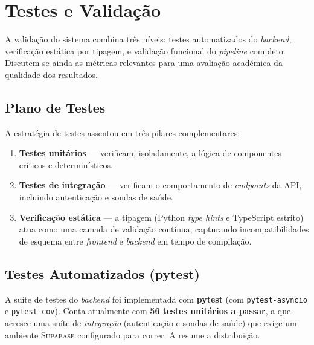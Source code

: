 \chapter{Testes e Validação}
\label{cap:testes}

A validação do sistema combina três níveis: testes automatizados do
\emph{backend}, verificação estática por tipagem, e validação funcional do
\emph{pipeline} completo. Discutem-se ainda as métricas relevantes para
uma avaliação académica da qualidade dos resultados.

\section{Plano de Testes}
\label{sec:plano_testes}

A estratégia de testes assentou em três pilares complementares:

\begin{enumerate}[leftmargin=*]
  \item \textbf{Testes unitários} — verificam, isoladamente, a lógica de
  componentes críticos e determinísticos.
  \item \textbf{Testes de integração} — verificam o comportamento de
  \emph{endpoints} da API, incluindo autenticação e sondas de saúde.
  \item \textbf{Verificação estática} — a tipagem (Python \emph{type
  hints} e TypeScript estrito) atua como uma camada de validação contínua,
  capturando incompatibilidades de esquema entre \emph{frontend} e
  \emph{backend} em tempo de compilação.
\end{enumerate}

\section{Testes Automatizados (pytest)}
\label{sec:pytest}

A suíte de testes do \emph{backend} foi implementada com \textbf{pytest}
(com \texttt{pytest-asyncio} e \texttt{pytest-cov}). Conta atualmente com
\textbf{56 testes unitários a passar}, a que acresce uma suíte de
\emph{integração} (autenticação e sondas de saúde) que exige um ambiente
\textsc{Supabase} configurado para correr. A  resume a
distribuição.

